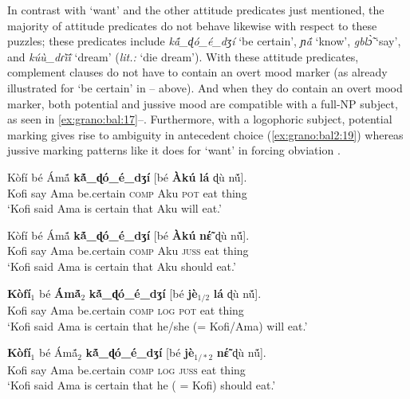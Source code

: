 \documentclass[output=paper,modfonts,nonflat]{langsci/langscibook}
\newcommand{\Z}{ʒ}
\newcommand{\D}{ɖ}
\newcommand{\ny}{ɲ}
\newcommand{\R}{ɾ}
\newcommand{\á}{\'{ã}}
\newcommand{\É}{\'{\~{ε}}}
\newcommand{\È}{\`{\~{ε}}}
\newcommand{\í}{\'{\~{i}}}
\newcommand{\ì}{\`{\~{i}}}
\newcommand{\Ó}{\'{\~{ɔ}}}
\newcommand{\Ò}{\`{\~{ɔ}}}
\newcommand{\ú}{\'{ũ}}
\newcommand{\ù}{\`{ũ}}
\begin{document}
In contrast with `want' and the other attitude predicates just mentioned, the majority of attitude predicates do not behave likewise with respect to these puzzles; these predicates include \emph{k\'{\~a}\_{\D}\'o\_\'e\_d{\Z}\'i} `be certain', \emph{{\ny}{\á}} `know', \emph{gbl{\Ò}} `say', and \emph{k\'u\`u\_d{\R}\`{\~i}\'{\~i}} `dream' (\emph{lit.:} `die dream'). With these attitude predicates, complement clauses do not have to contain an overt mood marker (as already illustrated for `be certain' in -- above). And when they do contain an overt mood marker, both potential and jussive mood are compatible with a full-NP subject, as seen in \ref{ex:grano:bal:17}--. Furthermore, with a logophoric subject, potential marking gives rise to ambiguity in antecedent choice (\ref{ex:grano:bal2:19}) whereas jussive marking patterns like it does for `want' in forcing obviation .

\ea
\gll K\`of\'i b\'e \'Am\'{\~a} \textbf{k\'{\~a}\_{\D}\'o\_\'e\_d{\Z}\'i} [b\'e \textbf{\`Ak\'u} \textbf{l\'a} {\D}\`u n\'{\~u}].\\
Kofi say Ama be.certain \textsc{comp} Aku \textsc{pot} eat thing\\
\glt`Kofi said Ama is certain that Aku will eat.' \label{ex:grano:bal:17}  
\z

\ea
\gll K\`of\'i b\'e \'Am\'{\~a}  \textbf{k\'{\~a}\_{\D}\'o\_\'e\_d{\Z}\'i} [b\'e \textbf{\`Ak\'u} \textbf{n{\É}} {\D}\`u n\'{\~u}].\\
Kofi say Ama be.certain \textsc{comp} Aku \textsc{juss} eat thing\\
\glt `Kofi said Ama is certain that Aku should eat.' \label{ex:grano:ban:18}  
\z

\ea 
\gll \textbf{K\`of\'i$_{1}$} b\'e \textbf{\'Am\'{\~a}$_{2}$} \textbf{k\'{\~a}\_{\D}\'o\_\'e\_d{\Z}\'i} [b\'e \textbf{j\`e$_{1/2}$} \textbf{l\'a} {\D}\`u n\'{\~u}].\\
Kofi say Ama be.certain \textsc{comp} \textsc{log} \textsc{pot} eat thing\\
\glt `Kofi said Ama is certain that he/she (= Kofi/Ama) will eat.'  \label{ex:grano:bal2:19}
\z

\ea
\gll \textbf{K\`of\'i$_{1}$} b\'e  \'Am\'{\~a}$_{2}$ \textbf{k\'{\~a}\_{\D}\'o\_\'e\_d{\Z}\'i} [b\'e \textbf{j\`e$_{1/*2}$} \textbf{n{\É}} {\D}\`u n\'{\~u}].\\
Kofi say Ama be.certain \textsc{comp} \textsc{log} \textsc{juss} eat thing\\
\glt `Kofi said Ama is certain that he ( = Kofi) should eat.'  \label{ex:grano:ban2:20}
\z
\end{document}
